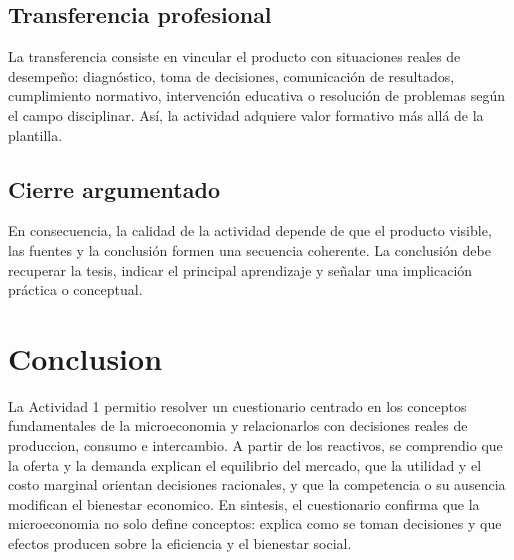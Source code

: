 \documentclass[
	spanish,
	letterpaper, oneside
]{article}
\begin{document}
\subsection*{Transferencia profesional}
La transferencia consiste en vincular el producto con situaciones reales de desempeño: diagnóstico, toma de decisiones, comunicación de resultados, cumplimiento normativo, intervención educativa o resolución de problemas según el campo disciplinar. Así, la actividad adquiere valor formativo más allá de la plantilla.

\subsection*{Cierre argumentado}
En consecuencia, la calidad de la actividad depende de que el producto visible, las fuentes y la conclusión formen una secuencia coherente. La conclusión debe recuperar la tesis, indicar el principal aprendizaje y señalar una implicación práctica o conceptual.


\section{Conclusion}

La Actividad 1 permitio resolver un cuestionario centrado en los conceptos fundamentales de la microeconomia y relacionarlos con decisiones reales de produccion, consumo e intercambio. A partir de los reactivos, se comprendio que la oferta y la demanda explican el equilibrio del mercado, que la utilidad y el costo marginal orientan decisiones racionales, y que la competencia o su ausencia modifican el bienestar economico. En sintesis, el cuestionario confirma que la microeconomia no solo define conceptos: explica como se toman decisiones y que efectos producen sobre la eficiencia y el bienestar social.

\end{document}
